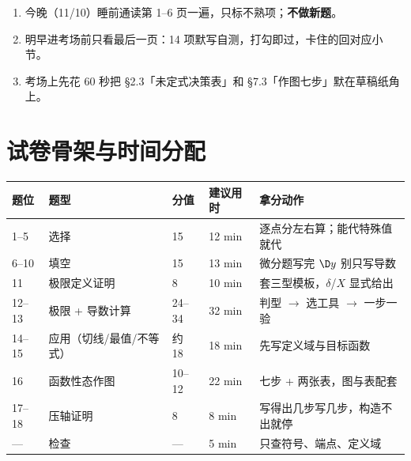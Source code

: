 \documentclass[UTF8,11pt]{ctexart}
\begin{document}
\vspace{2pt}


\vspace{4pt}

\vspace{6pt}
\begin{keypoint}
\begin{enumerate}[leftmargin=1.6em,itemsep=1pt]
\item 今晚（11/10）睡前通读第 1--6 页一遍，只标不熟项；\textbf{不做新题}。
\item 明早进考场前只看最后一页：14 项默写自测，打勾即过，卡住的回对应小节。
\item 考场上先花 60 秒把 §2.3「未定式决策表」和 §7.3「作图七步」默在草稿纸角上。
\end{enumerate}
\end{keypoint}

\section{试卷骨架与时间分配}

\begin{center}
\renewcommand{\arraystretch}{1.2}
\begin{tabular}{@{}p{1.6cm}p{3.6cm}p{1.8cm}p{1.9cm}p{5.9cm}@{}}
\toprule
\textbf{题位} & \textbf{题型} & \textbf{分值} & \textbf{建议用时} & \textbf{拿分动作} \\
\midrule
1--5 & 选择 & 15 & 12 min & 逐点分左右算；能代特殊值就代 \\
6--10 & 填空 & 15 & 13 min & 微分题写完 $\D y$ 别只写导数 \\
11 & 极限定义证明 & 8 & 10 min & 套三型模板，$\delta$/$X$ 显式给出 \\
12--13 & 极限 + 导数计算 & 24--34 & 32 min & 判型 $\to$ 选工具 $\to$ 一步一验 \\
14--15 & 应用（切线/最值/不等式） & 约 18 & 18 min & 先写定义域与目标函数 \\
16 & 函数性态作图 & 10--12 & 22 min & 七步 + 两张表，图与表配套 \\
17--18 & 压轴证明 & 8 & 8 min & 写得出几步写几步，构造不出就停 \\
— & 检查 & — & 5 min & 只查符号、端点、定义域 \\
\bottomrule
\end{tabular}
\end{center}
\end{document}
